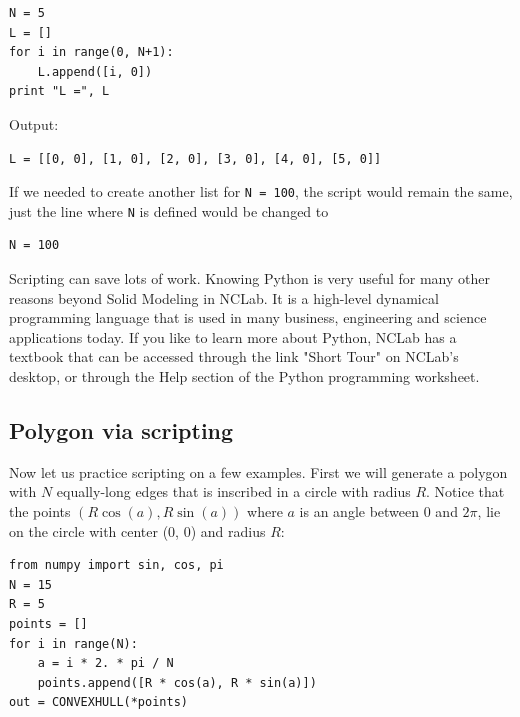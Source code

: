 \begin{bbox}
\begin{verbatim}
N = 5
L = []
for i in range(0, N+1):
    L.append([i, 0])
print "L =", L
\end{verbatim}
\end{bbox}
\vspace{6mm}

\noindent
Output:\\
\begin{ybox}
\begin{verbatim}
L = [[0, 0], [1, 0], [2, 0], [3, 0], [4, 0], [5, 0]]
\end{verbatim}
\end{ybox}
\vspace{6mm}

\noindent
If we needed to create another list for {\tt N = 100}, the script would remain the same,
just the line where {\tt N} is defined would be changed to \\

\begin{bbox}
\begin{verbatim}
N = 100
\end{verbatim}
\end{bbox}
\vspace{6mm}

\noindent
Scripting can save lots of work. Knowing Python is very useful for many other
reasons beyond Solid Modeling in NCLab. It is a high-level dynamical programming 
language that is used in many business, engineering and science applications 
today. If you like to learn more about Python, NCLab has a textbook that can be 
accessed through the link "Short Tour" on NCLab's desktop, or through the Help
section of the Python programming worksheet. 

\subsection{Polygon via scripting}\label{subsec:polygon}

Now let us practice scripting on a few examples.
First we will generate a polygon with $N$ equally-long 
edges that is inscribed in 
a circle with radius $R$. Notice that the points
$(R  \cos(a), R  \sin(a))$ where $a$ is an angle between 
$0$ and $2\pi$, lie on the circle with center (0, 0) and 
radius $R$:\\

\begin{bbox}
\begin{verbatim}
from numpy import sin, cos, pi
N = 15
R = 5
points = []
for i in range(N):
    a = i * 2. * pi / N
    points.append([R * cos(a), R * sin(a)])
out = CONVEXHULL(*points)
\end{verbatim}
\end{bbox}


